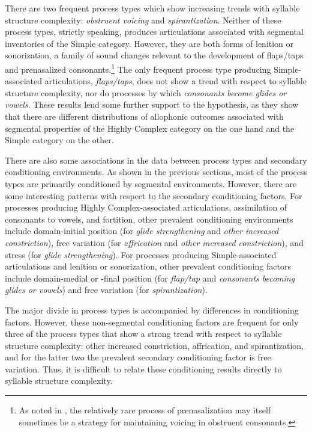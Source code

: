   There are two frequent process types which show increasing trends with syllable structure complexity: \textit{obstruent voicing} and \textit{spirantization}. Neither of these process types, strictly speaking, produces articulations associated with segmental inventories of the Simple category. However, they are both forms of lenition or sonorization, a family of sound changes relevant to the development of flaps/taps and prenasalized consonants.{\footnote{As noted in , the relatively rare process of prenasalization may itself sometimes be a strategy for maintaining voicing in obstruent consonants.}} The only frequent process type producing Simple-associated articulations, \textit{flaps/taps}, does not show a trend with respect to syllable structure complexity, nor do processes by which \textit{consonants become glides or vowels}. These results lend some further support to the hypothesis, as they show that there are different distributions of allophonic outcomes associated with segmental properties of the Highly Complex category on the one hand and the Simple category on the other.

  There are also some associations in the data between process types and secondary conditioning environments. As shown in the previous sections, most of the process types are primarily conditioned by segmental environments. However, there are some interesting patterns with respect to the secondary conditioning factors. For processes producing Highly Complex-associated articulations, assimilation of consonants to vowels, and fortition, other prevalent conditioning environments include domain-initial position (for \textit{glide strengthening} and \textit{other increased constriction}), free variation (for \textit{affrication} and \textit{other increased constriction}), and stress (for \textit{glide strengthening}). For processes producing Simple-associated articulations and lenition or sonorization, other prevalent conditioning factors include domain-medial or -final position (for \textit{flap/tap} and \textit{consonants becoming glides or vowels}) and free variation (for \textit{spirantization}). 

  The major divide in process types is accompanied by differences in conditioning factors. However, these non-segmental conditioning factors are frequent for only three of the process types that show a strong trend with respect to syllable structure complexity: other increased constriction, affrication, and spirantization, and for the latter two the prevalent secondary conditioning factor is free variation. Thus, it is difficult to relate these conditioning results directly to syllable structure complexity.

